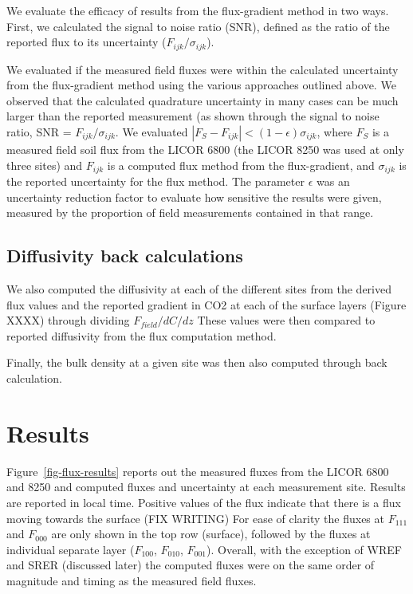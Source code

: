 \documentclass[
  letterpaper,
  DIV=11,
  numbers=noendperiod]{scrartcl}
\begin{document}
We evaluate the efficacy of results from the flux-gradient method in two
ways. First, we calculated the signal to noise ratio (SNR), defined as
the ratio of the reported flux to its uncertainty
(\(F_{ijk}/\sigma_{ijk}\)).

We evaluated if the measured field fluxes were within the calculated
uncertainty from the flux-gradient method using the various approaches
outlined above. We observed that the calculated quadrature uncertainty
in many cases can be much larger than the reported measurement (as shown
through the signal to noise ratio, SNR = \(F_{ijk}/\sigma_{ijk}\). We
evaluated \(| F_{S} - F_{ijk} | < (1-\epsilon) \sigma_{ijk}\), where
\(F_{S}\) is a measured field soil flux from the LICOR 6800 (the LICOR
8250 was used at only three sites) and \(F_{ijk}\) is a computed flux
method from the flux-gradient, and \(\sigma_{ijk}\) is the reported
uncertainty for the flux method. The parameter \(\epsilon\) was an
uncertainty reduction factor to evaluate how sensitive the results were
given, measured by the proportion of field measurements contained in
that range.

\subsection{Diffusivity back
calculations}\label{diffusivity-back-calculations}

We also computed the diffusivity at each of the different sites from the
derived flux values and the reported gradient in CO2 at each of the
surface layers (Figure XXXX) through dividing \(F_{field}/dC/dz\) These
values were then compared to reported diffusivity from the flux
computation method.

Finally, the bulk density at a given site was then also computed through
back calculation.

\section{Results}\label{results}

Figure~\ref{fig-flux-results} reports out the measured fluxes from the
LICOR 6800 and 8250 and computed fluxes and uncertainty at each
measurement site. Results are reported in local time. Positive values of
the flux indicate that there is a flux moving towards the surface (FIX
WRITING) For ease of clarity the fluxes at \(F_{111}\) and \(F_{000}\)
are only shown in the top row (surface), followed by the fluxes at
individual separate layer (\(F_{100}\), \(F_{010}\), \(F_{001}\)).
Overall, with the exception of WREF and SRER (discussed later) the
computed fluxes were on the same order of magnitude and timing as the
measured field fluxes.
\end{document}
